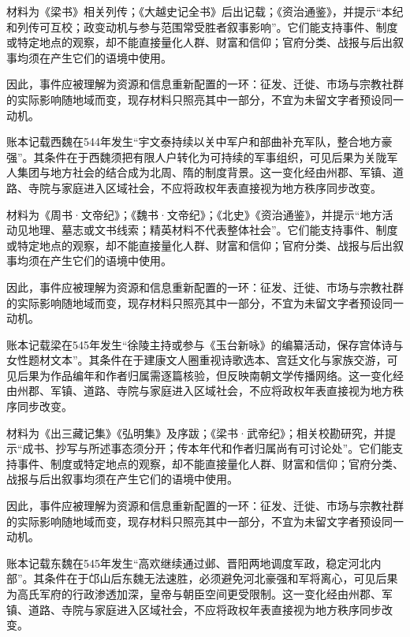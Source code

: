 材料为《梁书》相关列传；《大越史记全书》后出记载；《资治通鉴》，并提示“本纪和列传可互校；政变动机与参与范围常受胜者叙事影响”。它们能支持事件、制度或特定地点的观察，却不能直接量化人群、财富和信仰；官府分类、战报与后出叙事均须在产生它们的语境中使用。

因此，事件应被理解为资源和信息重新配置的一环：征发、迁徙、市场与宗教社群的实际影响随地域而变，现存材料只照亮其中一部分，不宜为未留文字者预设同一动机。

账本记载西魏在544年发生“宇文泰持续以关中军户和部曲补充军队，整合地方豪强”。其条件在于西魏须把有限人户转化为可持续的军事组织，可见后果为关陇军人集团与地方社会的结合成为北周、隋的制度背景。这一变化经由州郡、军镇、道路、寺院与家庭进入区域社会，不应将政权年表直接视为地方秩序同步改变。

材料为《周书·文帝纪》；《魏书·文帝纪》；《北史》《资治通鉴》，并提示“地方活动见地理、墓志或文书线索；精英材料不代表整体社会”。它们能支持事件、制度或特定地点的观察，却不能直接量化人群、财富和信仰；官府分类、战报与后出叙事均须在产生它们的语境中使用。

因此，事件应被理解为资源和信息重新配置的一环：征发、迁徙、市场与宗教社群的实际影响随地域而变，现存材料只照亮其中一部分，不宜为未留文字者预设同一动机。

账本记载梁在545年发生“徐陵主持或参与《玉台新咏》的编纂活动，保存宫体诗与女性题材文本”。其条件在于建康文人圈重视诗歌选本、宫廷文化与家族交游，可见后果为作品编年和作者归属需逐篇核验，但反映南朝文学传播网络。这一变化经由州郡、军镇、道路、寺院与家庭进入区域社会，不应将政权年表直接视为地方秩序同步改变。

材料为《出三藏记集》《弘明集》及序跋；《梁书·武帝纪》；相关校勘研究，并提示“成书、抄写与所述事态须分开；传本年代和作者归属尚有可讨论处”。它们能支持事件、制度或特定地点的观察，却不能直接量化人群、财富和信仰；官府分类、战报与后出叙事均须在产生它们的语境中使用。

因此，事件应被理解为资源和信息重新配置的一环：征发、迁徙、市场与宗教社群的实际影响随地域而变，现存材料只照亮其中一部分，不宜为未留文字者预设同一动机。

账本记载东魏在545年发生“高欢继续通过邺、晋阳两地调度军政，稳定河北内部”。其条件在于邙山后东魏无法速胜，必须避免河北豪强和军将离心，可见后果为高氏军府的行政渗透加深，皇帝与朝臣空间更受限制。这一变化经由州郡、军镇、道路、寺院与家庭进入区域社会，不应将政权年表直接视为地方秩序同步改变。

